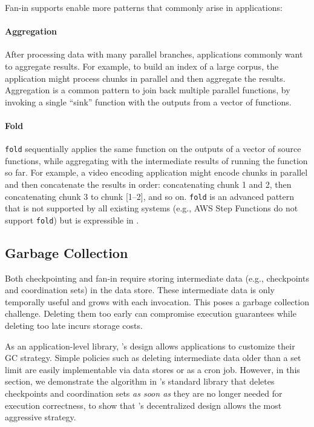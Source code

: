 Fan-in supports enable more patterns that commonly arise in applications:

\paragraph{Aggregation}
After processing data with many parallel branches, applications commonly want to
aggregate results. For example, to build an index of a large corpus, the
application might process chunks in parallel and then aggregate the results.
Aggregation is a common pattern to join back multiple parallel functions, by
invoking a single ``sink'' function with the outputs from a vector of functions.

\paragraph{Fold}
\texttt{fold} sequentially applies the same function on the outputs of a vector
of source functions, while aggregating with the intermediate results of running
the function so far. For example, a video encoding application might encode
chunks in parallel and then concatenate the results in order: concatenating
chunk 1 and 2, then concatenating chunk 3 to chunk [1--2], and so on.
\texttt{fold} is an advanced pattern that is not supported by all existing
systems (e.g., AWS Step Functions do not support \texttt{fold}) but is
expressible in \name{}.


\subsection{Garbage Collection}\label{sec:design:garbage}

Both checkpointing and fan-in require storing intermediate data (e.g.,
checkpoints and coordination sets) in the data store. These intermediate data
is only temporally useful and grows with each invocation. This poses a garbage
collection challenge. Deleting them too early can compromise execution
guarantees while deleting too late incurs storage costs.

As an application-level library, \name{}'s design allows applications to
customize their GC strategy. Simple policies such as deleting intermediate
data older than a set limit are easily implementable via data stores or as a
cron job. However, in this section, we demonstrate the algorithm in \name{}'s
standard library that deletes checkpoints and coordination sets \emph{as soon
as} they are no longer needed for execution correctness, to show that
\name{}'s decentralized design allows the most aggressive strategy.

